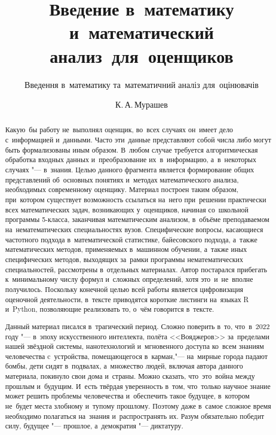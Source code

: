 \documentclass[]{scrartcl}
\title{Введение в~математику и~математический анализ~для~оценщиков}
\subtitle{Введення в~математику та~математичний аналіз для~оцінювачів}
\author{К.\,А.\,Мурашев}
\begin{document}
\maketitle

\begin{abstract}
	Какую~бы работу не~выполнял оценщик, во~всех случаях он~имеет дело с~информацией и~данными. Часто эти~данные представляют собой числа либо могут быть формализованы иным образом. В~любом случае требуется алгоритмическая обработка входных данных и~преобразование их~в~информацию, а~в~некоторых случаях "--- в~знания. Целью данного фрагмента является формирование общих представлений об~основных понятиях и~методах математического анализа, необходимых современному оценщику. Материал построен таким образом, при~котором существует возможность ссылаться на~него при~решении практически всех математических задач, возникающих у~оценщиков, начиная со~школьной программы 5-класса, заканчивая математическим анализом, в~объёме преподаваемом на~нематематических специальностях вузов. Специфические вопросы, касающиеся частотного подхода в~математической статистике, байесовского подхода, а~также математических методов, применяемых в~машинном обучении, а~также иных специфических методов, выходящих за~рамки программы нематематических специальностей, рассмотрены в~отдельных материалах.  Автор постарался прибегать к~минимальному числу формул и~сложных определений, хотя это~и~не~вполне получилось. Поскольку конечной целью всей работы является цифровизация оценочной деятельности, в~тексте приводятся короткие листинги на~языках R и~Python, позволяющие реализовать то, о~чём говорится в~тексте.
	
	Данный материал писался в~трагический период. Сложно поверить в~то, что~в~2022 году "--- в~эпоху искусственного интеллекта, полёта <<Вояджеров>> за~пределами нашей звёздной системы, нанотехнологий и~мгновенного доступа ко~всем знаниям человечества c~устройства, помещающегося в~карман,"--- на~мирные города падают бомбы, дети сидят в~подвалах, а~множество людей, включая автора данного материала, покинуло свои дома и~страны.  Можно сказать, что~это~война между прошлым и~будущим. И~есть твёрдая уверенность в~том, что~только научное знание может решить проблемы человечества и~обеспечить такое будущее, в~котором не~будет места злобному и~тупому прошлому. Поэтому даже в~самое сложное время необходимо полагаться на~знания и~распространять их. Разум обязательно победит силу, будущее "--- прошлое, а~демократия "--- диктатуру. 
\end{abstract}
\end{document}
